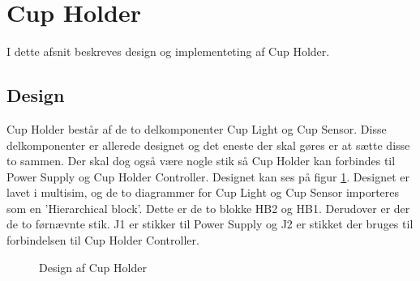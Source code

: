 \documentclass[HardwareDesign/HardwareDesign_main.tex]{subfiles}
\begin{document}
\section{Cup Holder}\label{sec:cupholder_hw_design}
I dette afsnit beskreves design og implementeting af Cup Holder.

\subsection{Design}
Cup Holder består af de to delkomponenter Cup Light og Cup Sensor. Disse delkomponenter er allerede designet og det eneste der skal gøres er at sætte disse to sammen. Der skal dog også være nogle stik så Cup Holder kan forbindes til Power Supply og Cup Holder Controller.
Designet kan ses på figur \ref{fig:CupHolderDesign}. Designet er lavet i multisim, og de to diagrammer for Cup Light og Cup Sensor importeres som en 'Hierarchical block'. Dette er de to blokke HB2 og HB1. Derudover er der de to førnævnte stik. J1 er stikker til Power Supply og J2 er stikket der bruges til forbindelsen til Cup Holder Controller. 

\begin{figure}[H]
    \centering
    \caption{Design af Cup Holder}
    \label{fig:CupHolderDesign}
\end{figure}
\end{document}
